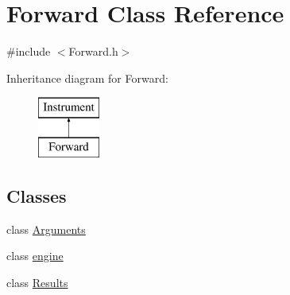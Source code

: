 \hypertarget{class_forward}{}\section{Forward Class Reference}
\label{class_forward}


{\ttfamily \#include $<$Forward.\+h$>$}

Inheritance diagram for Forward\+:\begin{figure}[H]
\begin{center}
\leavevmode
\includegraphics[height=2.000000cm]{class_forward}
\end{center}
\end{figure}
\subsection*{Classes}
\begin{DoxyCompactItemize}
\item 
class \hyperlink{class_forward_1_1_arguments}{Arguments}
\item 
class \hyperlink{class_forward_1_1engine}{engine}
\item 
class \hyperlink{class_forward_1_1_results}{Results}
\end{DoxyCompactItemize}
